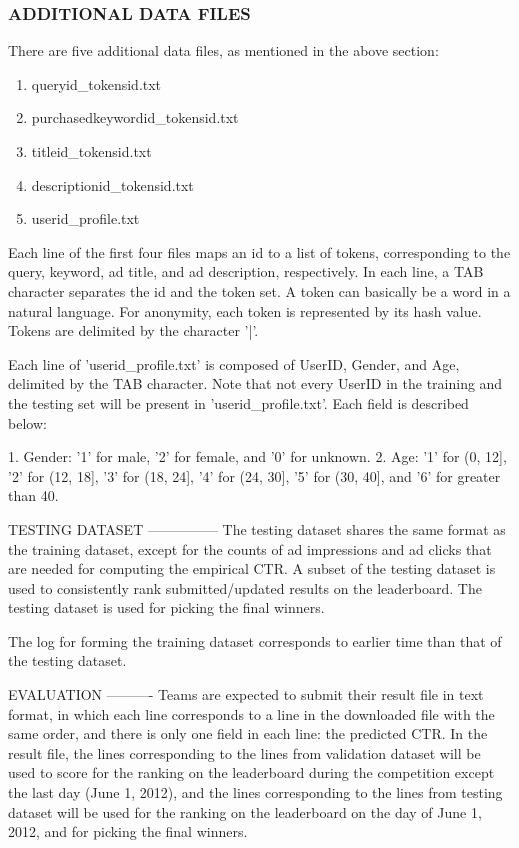 \documentclass[10pt,a4paper]{ctexbook}
\begin{document}
\subsubsection{ADDITIONAL DATA FILES}
There are five additional data files, as mentioned in the above section: 
\begin{enumerate}
\item queryid\_tokensid.txt 
\item purchasedkeywordid\_tokensid.txt 
\item titleid\_tokensid.txt 
\item descriptionid\_tokensid.txt 
\item userid\_profile.txt 
\end{enumerate}

Each line of the first four files maps an id to a list of tokens, corresponding to the query, keyword, ad title, and ad description, respectively. In each line, a TAB character separates the id and the token set.  A token can basically be a word in a natural language. For anonymity, each token is represented by its hash value.  Tokens are delimited by the character '|'. 

Each line of 'userid\_profile.txt' is composed of UserID, Gender, and Age, delimited by the TAB character. Note that not every UserID in the training and the testing set will be present in 'userid\_profile.txt'. Each field is described below: 

1. Gender: 
   '1'  for male, '2' for female,  and '0'  for unknown. 
2. Age: 
   '1'  for (0, 12],  '2' for (12, 18], '3' for (18, 24], '4'  for  (24, 30], '5' for (30,  40], and '6' for greater than 40. 

TESTING DATASET
---------------
The testing dataset shares the same format as the training dataset, except for the counts of ad impressions and ad clicks that are needed for computing the empirical CTR. A subset of the testing dataset is used to consistently rank submitted/updated results on the leaderboard. The testing dataset is used for picking the final winners.

The log for forming the training dataset corresponds to earlier time than that of the testing dataset.

EVALUATION
----------
Teams are expected to submit their result file in text format, in which each line corresponds to a line in the downloaded file with the same order, and there is only one field in each line: the predicted CTR. In the result file, the lines corresponding to the lines from validation dataset will be used to score for the ranking on the leaderboard during the competition except the last day (June 1, 2012), and the lines corresponding to the lines from testing dataset will be used for the ranking on the leaderboard on the day of June 1, 2012, and for picking the final winners.
\end{document}
